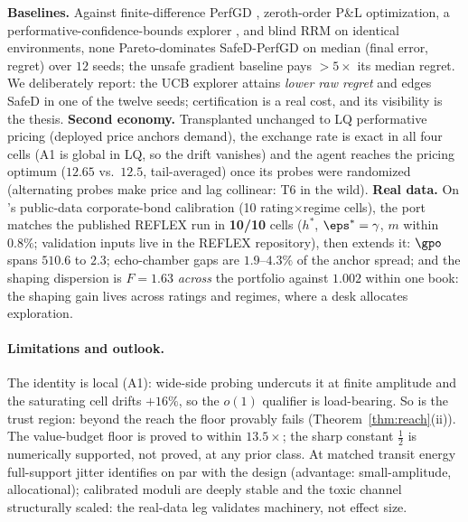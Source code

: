 \documentclass{article}
\begin{document}
\textbf{Baselines.} Against finite-difference PerfGD \citep{izzo2021learn}, zeroth-order P\&L optimization, a performative-confidence-bounds explorer \citep{jagadeesan2022regret}, and blind RRM on identical environments, none Pareto-dominates SafeD-PerfGD on median (final error, regret) over $12$ seeds; the unsafe gradient baseline pays $>5\times$ its median regret. We deliberately report: the UCB explorer attains \emph{lower raw regret} and edges SafeD in one of the twelve seeds; certification is a real cost, and its visibility is the thesis. \textbf{Second economy.} Transplanted unchanged to LQ performative pricing (deployed price anchors demand), the exchange rate is exact in all four cells (A1 is global in LQ, so the drift vanishes) and the agent reaches the pricing optimum ($12.65$ vs.\ $12.5$, tail-averaged) once its probes were randomized (alternating probes make price and lag collinear: T6 in the wild). \textbf{Real data.} On \citet{reflex2026}'s public-data corporate-bond calibration (10 rating$\times$regime cells), the port matches the published REFLEX run in \textbf{10/10} cells ($h^*$, $\eps^* = \gamma$, $m$ within $0.8\%$; validation inputs live in the REFLEX repository), then extends it: $\gpo$ spans $510.6$ to $2.3$; echo-chamber gaps are $1.9$--$4.3\%$ of the anchor spread; and the shaping dispersion is $F = 1.63$ \emph{across} the portfolio against $1.002$ within one book: the shaping gain lives across ratings and regimes, where a desk allocates exploration.

\paragraph{Limitations and outlook.}\label{sec:limits} The identity is local (A1): wide-side probing undercuts it at finite amplitude and the saturating cell drifts $+16\%$, so the $o(1)$ qualifier is load-bearing. So is the trust region: beyond the reach the floor provably fails (Theorem~\ref{thm:reach}(ii)). The value-budget floor is proved to within $13.5\times$; the sharp constant $\tfrac12$ is numerically supported, not proved, at any prior class. At matched transit energy full-support jitter identifies on par with the design (advantage: small-amplitude, allocational); calibrated moduli are deeply stable and the toxic channel structurally scaled: the real-data leg validates machinery, not effect size.




\clearpage
\appendix
\end{document}
